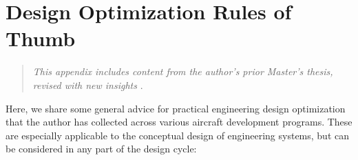\chapter{Design Optimization Rules of Thumb}
\label{appendix:rules-of-thumb}

\begin{quote}
    \emph{This appendix includes content from the author's prior Master's thesis, revised with new insights} \cite{sharpe_aerosandbox_2021}.
\end{quote}

Here, we share some general advice for practical engineering design optimization that the author has collected across various aircraft development programs. These are especially applicable to the conceptual design of engineering systems, but can be considered in any part of the design cycle:

